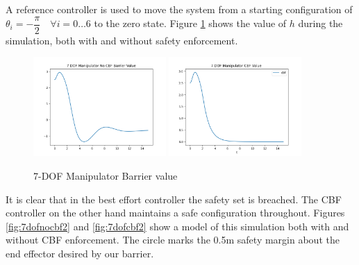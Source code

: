 \noindent A reference controller is used to move the system from a starting configuration of $\theta_i = -\dfrac{\pi}{2} \quad \forall i= 0\hdots6$ to the zero state. Figure \ref{fig:7dofbarriervalue2} shows the value of $h$ during the simulation, both with and without safety enforcement.

\begin{figure}[H]
    \centering
    \includegraphics[width=0.45\textwidth]{Figures/Examples/7DOF/7DOFNoCBFValue.png}
    \includegraphics[width=0.45\textwidth]{Figures/Examples/7DOF/7DOFCBFValue.png}
    \caption{7-DOF Manipulator Barrier value}
    \label{fig:7dofbarriervalue2}
\end{figure}

\noindent It is clear that in the best effort controller the safety set is breached. The CBF controller on the other hand maintains a safe configuration throughout. Figures \ref{fig:7dofnocbf2} and \ref{fig:7dofcbf2} show a model of this simulation both with and without CBF enforcement. The circle marks the 0.5m safety margin about the end effector desired by our barrier.

